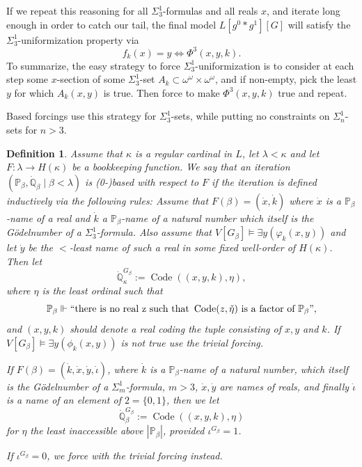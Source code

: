 \documentclass[a4paper,11pt]{article}
\newtheorem{definition}[theorem]{Definition}
\newcommand{\forceP}{\mathbb{P}}
\newcommand{\forceQ}{\mathbb{Q}}
\begin{document}
If we repeat this reasoning for all $\Sigma^1_3$-formulas and all reals $x$, and iterate long enough in order to catch our tail, the final model $L[g^0 \ast g^1][G]$ will 
satisfy the $\Sigma^1_3$-uniformization property via
\[f_k (x)=y \Leftrightarrow \Phi^3 (x,y,k). \]
To summarize, the easy strategy to force $\Sigma^1_3$-uniformization is to consider at each step some $x$-section of some $\Sigma^1_3$-set $A_k \subset \omega^{\omega} \times \omega^{\omega}$, and if non-empty, pick the least $y$ for which $A_k(x,y)$ is true. Then force to make $\Phi^3(x,y,k)$ true and repeat.

Based forcings use this strategy for $\Sigma^1_3$-sets, while putting no constraints on $\Sigma^1_n$-sets for $n > 3$.

\begin{definition}
Assume that $\kappa$ is a regular cardinal in $L$, let $\lambda < \kappa$ and let $F: \lambda \rightarrow H(\kappa)$ be a bookkeeping function. We say that an iteration $(\forceP_{\beta}, \dot{\forceQ}_{\beta} \mid \beta < \lambda)$ is (0-)based with respect to $F$ if the iteration is defined inductively via the following rules:
Assume that $F(\beta)= (\dot{x}, \dot{k})$ where $\dot{x}$ is a $\forceP_{\beta}$-name of a real
and $\dot{k}$ a $\forceP_{\beta}$-name of a natural number which itself is the G\"odelnumber of a $\Sigma^1_3$-formula. Also assume that $V[G_{\beta}] \models \exists y (\varphi_{k}(x,y))$ and let $\dot{y}$ be the $<$-least name of such a real in some fixed well-order of $H(\kappa)$.
Then let \[ \dot{\forceQ}_{\kappa}^{G_{\beta}} := \operatorname{Code} ((x,y,k), \eta), \] where $\eta$ is the least ordinal such that \[ \forceP_{\beta} \Vdash ``\text{there is no real z such that } \operatorname{Code} (z, \check{\eta} ) \text{ is a factor of } \forceP_{\beta}" ,\] and $(x,y,k)$ should denote a real coding the tuple consisting of $x,y$ and $k$.
If $V[G_{\beta}] \models \exists y (\phi_{k}(x,y))$ is not true use the trivial forcing.

If $F(\beta)= (\dot{k}, \dot{x},\dot{y}, \dot{\iota} )$, where $\dot{k}$ is a $\forceP_{\beta}$-name of a natural number, which itself is the G\"odelnumber of a $\Sigma^1_m$-formula, $m > 3$,  $\dot{x},\dot{y}$ are names of reals, and finally $\dot{\iota}$ is a name of an element of $2= \{0,1 \}$, then we let
\[ \dot{\forceQ}_{\beta}^{G_{\beta}} := \operatorname{Code} ((x,y,k),\eta) \]
for $\eta$ the least inaccessible above $| \forceP_{\beta} |$, provided $\iota^{G_{\beta}}=1$.


If $\iota^{G_{\beta}}=0$, we force with the trivial forcing instead.

\end{definition}
\end{document}

